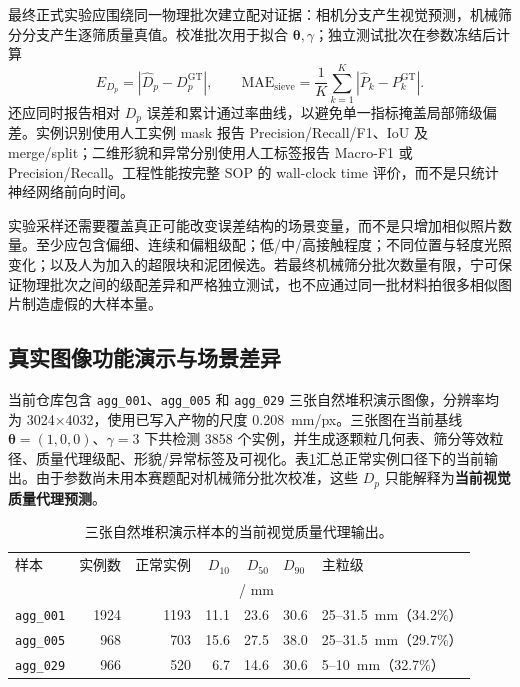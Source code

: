 最终正式实验应围绕同一物理批次建立配对证据：相机分支产生视觉预测，机械筛分分支产生逐筛质量真值。校准批次用于拟合 $\boldsymbol{\theta},\gamma$；独立测试批次在参数冻结后计算
\begin{equation}
 E_{D_p}=\left|\widehat D_p-D_p^{\mathrm{GT}}\right|,
 \qquad
 \mathrm{MAE}_{\mathrm{sieve}}=\frac{1}{K}\sum_{k=1}^{K}\left|\widehat P_k-P_k^{\mathrm{GT}}\right|.
\label{eq:r-metrics}
\end{equation}
还应同时报告相对 $D_p$ 误差和累计通过率曲线，以避免单一指标掩盖局部筛级偏差。实例识别使用人工实例 mask 报告 Precision/Recall/F1、IoU 及 merge/split；二维形貌和异常分别使用人工标签报告 Macro-F1 或 Precision/Recall。工程性能按完整 SOP 的 wall-clock time 评价，而不是只统计神经网络前向时间。

实验采样还需要覆盖真正可能改变误差结构的场景变量，而不是只增加相似照片数量。至少应包含偏细、连续和偏粗级配；低/中/高接触程度；不同位置与轻度光照变化；以及人为加入的超限块和泥团候选。若最终机械筛分批次数量有限，宁可保证物理批次之间的级配差异和严格独立测试，也不应通过同一批材料拍很多相似图片制造虚假的大样本量。

\subsection{真实图像功能演示与场景差异}

当前仓库包含 \texttt{agg\_001}、\texttt{agg\_005} 和 \texttt{agg\_029} 三张自然堆积演示图像，分辨率均为 3024$\times$4032，使用已写入产物的尺度 0.208~mm/px。三张图在当前基线 $\boldsymbol{\theta}=(1,0,0)$、$\gamma=3$ 下共检测 3858 个实例，并生成逐颗粒几何表、筛分等效粒径、质量代理级配、形貌/异常标签及可视化。表\ref{tab:r-demo-main}汇总正常实例口径下的当前输出。由于参数尚未用本赛题配对机械筛分批次校准，这些 $D_p$ 只能解释为\textbf{当前视觉质量代理预测}。

\begin{table}[t]
\centering
\caption{三张自然堆积演示样本的当前视觉质量代理输出。}
\label{tab:r-demo-main}
\footnotesize
\renewcommand{\arraystretch}{1.12}
\begin{tabular}{lrrrrll}
\toprule
样本 & 实例数 & 正常实例 & $D_{10}$ & $D_{50}$ & $D_{90}$ & 主粒级 \\
 & & & \multicolumn{3}{c}{/ mm} & \\
\midrule
\texttt{agg\_001} & 1924 & 1193 & 11.1 & 23.6 & 30.6 & 25--31.5~mm（34.2\%） \\
\texttt{agg\_005} & 968 & 703 & 15.6 & 27.5 & 38.0 & 25--31.5~mm（29.7\%） \\
\texttt{agg\_029} & 966 & 520 & 6.7 & 14.6 & 30.6 & 5--10~mm（32.7\%） \\
\bottomrule
\end{tabular}
\end{table}

